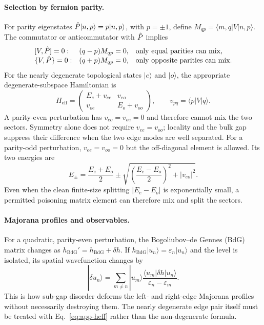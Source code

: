 \paragraph{Selection by fermion parity.}
For parity eigenstates $\hat{P}|n,p\rangle=p|n,p\rangle$, with $p=\pm1$, define
$M_{qp}=\langle m,q|V|n,p\rangle$. The commutator or anticommutator with
$\hat{P}$ implies
\begin{equation}
 \begin{array}{lll}
 [V,\hat{P}]=0:   &(q-p)M_{qp}=0,&\text{only equal parities can mix},\\
 \{V,\hat{P}\}=0:&(q+p)M_{qp}=0,&\text{only opposite parities can mix}.
 \end{array}
 \label{eq:app-selection}
\end{equation}
For the nearly degenerate topological states $|e\rangle$ and $|o\rangle$, the
appropriate degenerate-subspace Hamiltonian is
\begin{equation}
 H_{\mathrm{eff}}=
 \begin{pmatrix}
 E_e+v_{ee} & v_{eo}\\
 v_{oe} & E_o+v_{oo}
 \end{pmatrix},
 \qquad v_{pq}=\langle p|V|q\rangle.
 \label{eq:app-heff}
\end{equation}
A parity-even perturbation has $v_{eo}=v_{oe}=0$ and therefore cannot mix the
two sectors. Symmetry alone does not require $v_{ee}=v_{oo}$; locality and the
bulk gap suppress their difference when the two edge modes are well separated.
For a parity-odd perturbation, $v_{ee}=v_{oo}=0$ but the off-diagonal element is
allowed. Its two energies are
\begin{equation}
 E_\pm=\frac{E_e+E_o}{2}
 \pm\sqrt{\left(\frac{E_e-E_o}{2}\right)^2+|v_{eo}|^2}.
 \label{eq:app-splitting}
\end{equation}
Even when the clean finite-size splitting $|E_e-E_o|$ is exponentially small,
a permitted poisoning matrix element can therefore mix and split the sectors.

\paragraph{Majorana profiles and observables.}
For a quadratic, parity-even perturbation, the Bogoliubov--de Gennes (BdG)
matrix changes as $h_{\mathrm{BdG}}'=h_{\mathrm{BdG}}+\delta h$. If
$h_{\mathrm{BdG}}|u_n\rangle=\varepsilon_n|u_n\rangle$ and the level is
isolated, its spatial wavefunction changes by
\begin{equation}
 |\delta u_n\rangle=
 \sum_{m\ne n}|u_m\rangle
 \frac{\langle u_m|\delta h|u_n\rangle}
      {\varepsilon_n-\varepsilon_m}.
 \label{eq:app-bdg-response}
\end{equation}
This is how sub-gap disorder deforms the left- and right-edge Majorana profiles
without necessarily destroying them. The nearly degenerate edge pair itself
must be treated with Eq.~\eqref{eq:app-heff} rather than the non-degenerate
formula.

